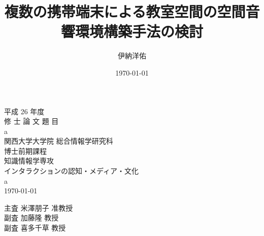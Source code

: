 \documentclass[11pt]{jreport}
\title{複数の携帯端末による教室空間の空間音響環境構築手法の検討}
\author{伊納洋佑}
\date{\today}
\newcommand{\thetitle}{a}
\newcommand{\theauthor}{a}
\begin{document}
  \thispagestyle{empty}
  \begin{center}
    \huge{平成 26 年度}\\
    \Huge{修 士 論 文 題 目}\\
    \vspace{1.5cm}\huge{\thetitle}\\ \vspace{3.0cm}
    \LARGE{関西大学大学院 総合情報学研究科}\\
    \LARGE{博士前期課程}\\
    \LARGE{知識情報学専攻}\\
    \vspace{0.8cm}\Large{インタラクションの認知・メディア・文化}\\
    \vspace{0.8cm}\LARGE{\theauthor}\\ \vspace{1.0cm}
    \today\vspace{1.5cm}
    \begin{itemize}
      \LARGE{主査\hspace{2cm} 米澤朋子 准教授}\\
      \LARGE{副査\hspace{2cm} 加藤隆 教授}\\
      \LARGE{副査\hspace{2cm} 喜多千草 教授}\\
    \end{itemize}
  \end{center}


  \tableofcontents
  \listoftables
  \listoffigures


  
  
  
  
  
  
  
  
  
  
  
\end{document}
